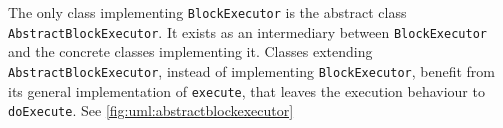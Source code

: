 %

The only class implementing \Verb|BlockExecutor| is the abstract class \Verb|AbstractBlockExecutor|.
It exists as an intermediary between \Verb|BlockExecutor| and the concrete classes implementing it.
Classes extending \Verb|AbstractBlockExecutor|, instead of implementing \Verb|BlockExecutor|, benefit from its general implementation of \Verb|execute|, that leaves the execution behaviour to \Verb|doExecute|.
See \ref{fig:uml:abstractblockexecutor}

